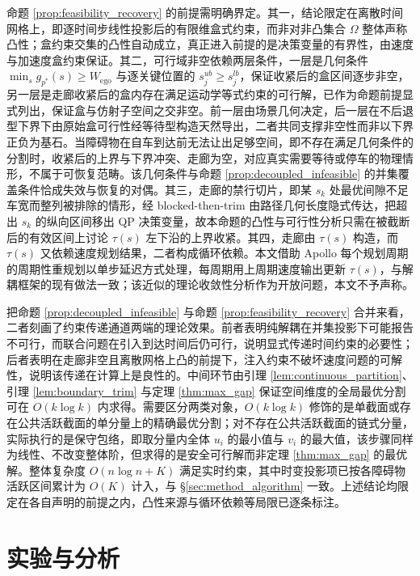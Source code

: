 \documentclass[a4paper,11pt]{ctexart}
\theoremstyle{definition}
\begin{document}
命题 \ref{prop:feasibility_recovery} 的前提需明确界定。其一，结论限定在离散时间网格上，即逐时间步线性投影后的有限维盒式约束，而非对非凸集合 $\Omega$ 整体声称凸性；盒约束交集的凸性自动成立，真正进入前提的是决策变量的有界性，由速度与加速度盒约束保证。其二，可行域非空依赖两层条件，一层是几何条件 $\min_s g_{p^{*}}(s) \geq W_{\text{ego}}$ 与逐关键位置的 $s_j^{ub} \geq s_j^{lb}$，保证收紧后的盒区间逐步非空，另一层是走廊收紧后的盒内存在满足运动学等式约束的可行解，已作为命题前提显式列出，保证盒与仿射子空间之交非空。前一层由场景几何决定，后一层在不后退型下界下由原始盒可行性经等待型构造天然导出，二者共同支撑非空性而非以下界正负为基石。当障碍物在自车到达前无法让出足够空间，即不存在满足几何条件的分割时，收紧后的上界与下界冲突、走廊为空，对应真实需要等待或停车的物理情形，不属于可恢复范畴。该几何条件与命题 \ref{prop:decoupled_infeasible} 的并集覆盖条件恰成失效与恢复的对偶。其三，走廊的禁行切片，即某 $s_k$ 处最优间隙不足车宽而整列被排除的情形，经 blocked-then-trim 由路径几何长度隐式传达，把超出 $s_k$ 的纵向区间移出 QP 决策变量，故本命题的凸性与可行性分析只需在被截断后的有效区间上讨论 $\tau(s)$ 左下沿的上界收紧。其四，走廊由 $\tau(s)$ 构造，而 $\tau(s)$ 又依赖速度规划结果，二者构成循环依赖。本文借助 Apollo 每个规划周期的周期性重规划以单步延迟方式处理，每周期用上周期速度输出更新 $\tau(s)$，与解耦框架的现有做法一致；该近似的理论收敛性分析作为开放问题，本文不予声称。

把命题 \ref{prop:decoupled_infeasible} 与命题 \ref{prop:feasibility_recovery} 合并来看，二者刻画了约束传递通道两端的理论效果。前者表明纯解耦在并集投影下可能报告不可行，而联合问题在引入到达时间后仍可行，说明显式传递时间约束的必要性；后者表明在走廊非空且离散网格上凸的前提下，注入约束不破坏速度问题的可解性，说明该传递在计算上是良性的。中间环节由引理 \ref{lem:continuous_partition}、引理 \ref{lem:boundary_trim} 与定理 \ref{thm:max_gap} 保证空间维度的全局最优分割可在 $O(k \log k)$ 内求得。需要区分两类对象，$O(k\log k)$ 修饰的是单截面或存在公共活跃截面的单分量上的精确最优分割；对不存在公共活跃截面的链式分量，实际执行的是保守包络，即取分量内全体 $u_i$ 的最小值与 $v_i$ 的最大值，该步骤同样为线性、不改变整体阶，但求得的是安全可行解而非定理 \ref{thm:max_gap} 的最优解。整体复杂度 $O(n \log n + K)$ 满足实时约束，其中时变投影项已按各障碍物活跃区间累计为 $O(K)$ 计入，与 §\ref{sec:method_algorithm} 一致。上述结论均限定在各自声明的前提之内，凸性来源与循环依赖等局限已逐条标注。

\section{实验与分析}
\label{sec:experiment}
\end{document}

